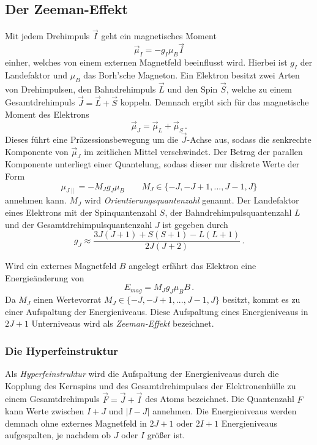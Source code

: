 \subsection{Der Zeeman-Effekt}
Mit jedem Drehimpuls $\vec{I}$ geht ein magnetisches Moment
\begin{equation}
\vec{\mu}_I = -g_I \mu_B \vec{I}
\end{equation}
einher, welches von einem externen Magnetfeld beeinflusst wird.
Hierbei ist $g_I$ der Landefaktor und $\mu_B$ das Borh'sche Magneton.
Ein Elektron besitzt zwei Arten von Drehimpulsen, den Bahndrehimpuls $\vec{L}$ und den Spin $\vec{S}$, welche zu einem Gesamtdrehimpuls $\vec{J} = \vec{L} + \vec{S}$ koppeln.
Demnach ergibt sich für das magnetische Moment des Elektrons
\begin{equation}
\vec{\mu}_J = \vec{\mu}_L + \vec{\mu}_S \, .
\end{equation}
Dieses führt eine Präzessionsbewegung um die $\vec{J}$-Achse aus, sodass die senkrechte Komponente von $\vec{\mu}_J$ im zeitlichen Mittel verschwindet.
Der Betrag der parallen Komponente unterliegt einer Quantelung, sodass dieser nur diskrete Werte der Form
\begin{equation}
\mu_{J\parallel} = - M_J g_J \mu_B \qquad M_J \in \{-J, -J+1, ..., J-1, J\}
\end{equation}
annehmen kann. 
$M_J$ wird \textit{Orientierungsquantenzahl} genannt.
Der Landefaktor eines Elektrons mit der Spinquantenzahl $S$, der Bahndrehimpulsquantenzahl $L$ und der Gesamtdrehimpulsquantenzahl $J$ ist gegeben durch
\begin{equation}
    \label{eq:afrika}
g_J \approx \frac{3 J(J+1)+S(S+1)- L(L+1)}{2J(J+2)}\, .
\end{equation}

Wird ein externes Magnetfeld $B$ angelegt erfährt das Elektron eine Energieänderung von
\begin{equation}\label{eq:deltaE}
E_{mag} = M_J g_J \mu_B B \, .
\end{equation}
Da $M_J$ einen Wertevorrat $M_J \in \{-J, -J+1, ..., J-1, J\}$ besitzt, kommt es zu einer Aufspaltung der Energieniveaus.
Diese Aufspaltung eines Energieniveaus in $2J+1$ Unterniveaus wird als \textit{Zeeman-Effekt} bezeichnet.

\subsubsection*{Die Hyperfeinstruktur}
Als \textit{Hyperfeinstruktur} wird die Aufspaltung der Energieniveaus durch die Kopplung des Kernspins und des Gesamtdrehimpulses der Elektronenhülle zu einem Gesamtdrehimpuls $\vec{F} = \vec{J} + \vec{I}$ des Atoms bezeichnet.
Die Quantenzahl $F$ kann Werte zwischen $I+J$ und $|I-J|$ annehmen.
Die Energieniveaus werden demnach ohne externes Magnetfeld in $2J+1$ oder $2I+1$ Energieniveaus aufgespalten, je nachdem ob $J$ oder $I$ größer ist.

